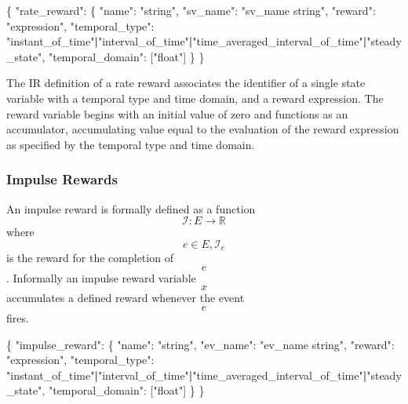 \documentclass[]{article}
\newenvironment{Shaded}{}{}
\newcommand{\DataTypeTok}[1]{\textcolor[rgb]{0.56,0.13,0.00}{#1}}
\newcommand{\StringTok}[1]{\textcolor[rgb]{0.25,0.44,0.63}{#1}}
\newcommand{\OtherTok}[1]{\textcolor[rgb]{0.00,0.44,0.13}{#1}}
\newcommand{\FunctionTok}[1]{\textcolor[rgb]{0.02,0.16,0.49}{#1}}
\newcommand{\ErrorTok}[1]{\textcolor[rgb]{1.00,0.00,0.00}{\textbf{#1}}}
\begin{document}
\begin{Shaded}
\begin{Highlighting}[]
\FunctionTok{\{} \DataTypeTok{"rate_reward"}\FunctionTok{:} \FunctionTok{\{}
    \DataTypeTok{"name"}\FunctionTok{:} \StringTok{"string"}\FunctionTok{,}
    \DataTypeTok{"sv_name"}\FunctionTok{:} \StringTok{"sv_name string"}\FunctionTok{,}
    \DataTypeTok{"reward"}\FunctionTok{:} \StringTok{"expression"}\FunctionTok{,}
    \DataTypeTok{"temporal_type"}\FunctionTok{:} \StringTok{"instant_of_time"}\ErrorTok{|}\StringTok{"interval_of_time"}\ErrorTok{|}\StringTok{"time_averaged_interval_of_time"}\ErrorTok{|}\StringTok{"steady_state"}\FunctionTok{,}
    \DataTypeTok{"temporal_domain"}\FunctionTok{:} \OtherTok{[}\StringTok{"float"}\OtherTok{]}
  \FunctionTok{\}}  
\FunctionTok{\}}
\end{Highlighting}
\end{Shaded}

The IR definition of a rate reward associates the identifier of a single
state variable with a temporal type and time domain, and a reward
expression. The reward variable begins with an initial value of zero and
functions as an accumulator, accumulating value equal to the evaluation
of the reward expression as specified by the temporal type and time
domain.

\subsubsection{Impulse Rewards}\label{impulse-rewards}

An impulse reward is formally defined as a function
\[\mathcal{I}: E \rightarrow \mathbb{R}\] where
\[e \in E, \mathcal{I}_e\] is the reward for the completion of \[e\].
Informally an impulse reward variable \[x\] accumulates a defined reward
whenever the event \[e\] fires.

\begin{Shaded}
\begin{Highlighting}[]
\FunctionTok{\{} \DataTypeTok{"impulse_reward"}\FunctionTok{:} \FunctionTok{\{}
    \DataTypeTok{"name"}\FunctionTok{:} \StringTok{"string"}\FunctionTok{,}
    \DataTypeTok{"ev_name"}\FunctionTok{:} \StringTok{"ev_name string"}\FunctionTok{,}
    \DataTypeTok{"reward"}\FunctionTok{:} \StringTok{"expression"}\FunctionTok{,}
    \DataTypeTok{"temporal_type"}\FunctionTok{:} \StringTok{"instant_of_time"}\ErrorTok{|}\StringTok{"interval_of_time"}\ErrorTok{|}\StringTok{"time_averaged_interval_of_time"}\ErrorTok{|}\StringTok{"steady_state"}\FunctionTok{,}
    \DataTypeTok{"temporal_domain"}\FunctionTok{:} \OtherTok{[}\StringTok{"float"}\OtherTok{]}
  \FunctionTok{\}}
\FunctionTok{\}}
\end{Highlighting}
\end{Shaded}
\end{document}
